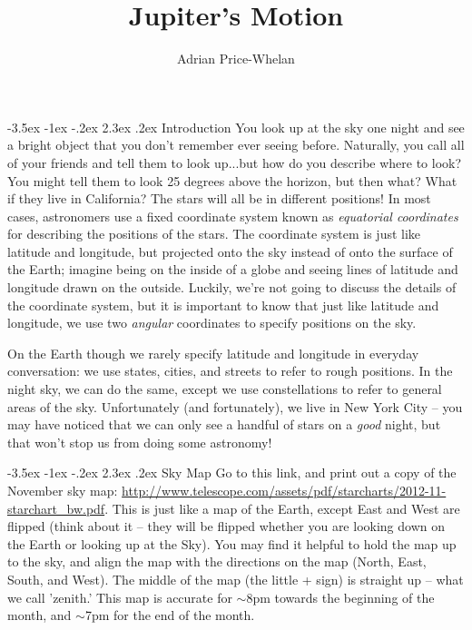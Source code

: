\documentclass[12pt]{article}
\makeatletter
\renewcommand\section{\@startsection{section}{1}{\z@}%
                                  {-3.5ex \@plus -1ex \@minus -.2ex}%
                                  {2.3ex \@plus.2ex}%
                                  {\normalfont\large\bfseries}}
\makeatother
\begin{document}
\title{Jupiter's Motion}
\author{Adrian Price-Whelan}
\date{}%

\maketitle

\section{Introduction}
\indent\indent You look up at the sky one night and see a bright object that you don't remember ever seeing before. Naturally, you call all of your friends and tell them to look up...but how do you describe where to look? You might tell them to look 25 degrees above the horizon, but then what? What if they live in California? The stars will all be in different positions! In most cases, astronomers use a fixed coordinate system known as \textit{equatorial coordinates} for describing the positions of the stars. The coordinate system is just like latitude and longitude, but projected onto the sky instead of onto the surface of the Earth; imagine being on the inside of a globe and seeing lines of latitude and longitude drawn on the outside. Luckily, we're not going to discuss the details of the coordinate system, but it is important to know that just like latitude and longitude, we use two \textit{angular} coordinates to specify positions on the sky. 

On the Earth though we rarely specify latitude and longitude in everyday conversation: we use states, cities, and streets to refer to rough positions. In the night sky, we can do the same, except we use constellations to refer to general areas of the sky. Unfortunately (and fortunately), we live in New York City -- you may have noticed that we can only see a handful of stars on a \emph{good} night, but that won't stop us from doing some astronomy! 

\section{Sky Map}
Go to this link, and print out a copy of the November sky map: \url{http://www.telescope.com/assets/pdf/starcharts/2012-11-starchart_bw.pdf}. This is just like a map of the Earth, except East and West are flipped (think about it -- they will be flipped whether you are looking down on the Earth or looking up at the Sky). You may find it helpful to hold the map up to the sky, and align the map with the directions on the map (North, East, South, and West). The middle of the map (the little + sign) is straight up -- what we call 'zenith.' This map is accurate for $\sim$8pm towards the beginning of the month, and $\sim$7pm for the end of the month. 
\end{document}
